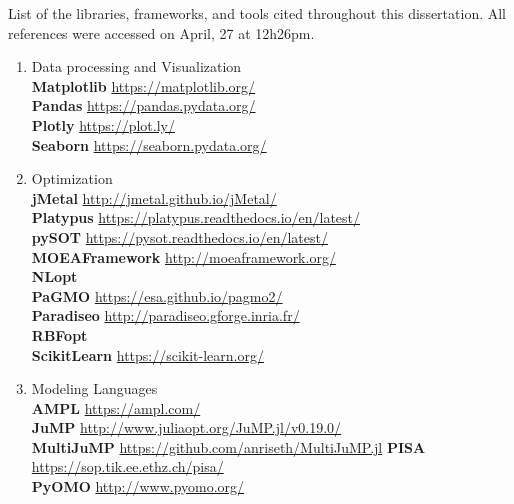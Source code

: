 List of the libraries, frameworks, and tools cited throughout this dissertation. All references were accessed on April, 27 at 12h26pm.
\begin{enumerate}[label=\Alph*]
\item Data processing and Visualization \\
\textbf{Matplotlib} \url{https://matplotlib.org/} \\
\textbf{Pandas} \url{https://pandas.pydata.org/} \\
\textbf{Plotly} \url{https://plot.ly/} \\
\textbf{Seaborn} \url{https://seaborn.pydata.org/}

\item Optimization \\
\textbf{jMetal} \url{http://jmetal.github.io/jMetal/} \\
\textbf{Platypus} \url{https://platypus.readthedocs.io/en/latest/} \\
\textbf{pySOT} \url{https://pysot.readthedocs.io/en/latest/} \\
\textbf{MOEAFramework} \url{http://moeaframework.org/} \\
\textbf{NLopt} \cite{NLOPT} \\
\textbf{PaGMO} \url{https://esa.github.io/pagmo2/} \\
\textbf{Paradiseo} \url{http://paradiseo.gforge.inria.fr/} \\
\textbf{RBFopt} \cite{RBFOPT} \\ 
\textbf{ScikitLearn} \url{https://scikit-learn.org/} 

\item Modeling Languages  \\
\textbf{AMPL} \url{https://ampl.com/} \\
\textbf{JuMP} \url{http://www.juliaopt.org/JuMP.jl/v0.19.0/} \\
\textbf{MultiJuMP} \url{https://github.com/anriseth/MultiJuMP.jl}
\textbf{PISA} \url{https://sop.tik.ee.ethz.ch/pisa/} \\
\textbf{PyOMO} \url{http://www.pyomo.org/} \\


\end{enumerate}

